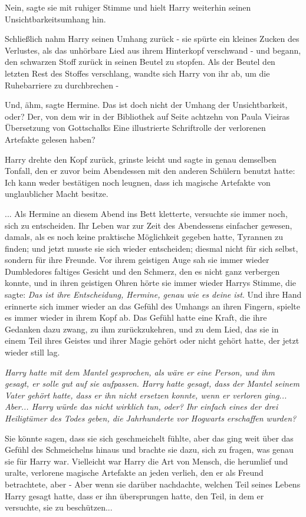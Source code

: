 \glqq{}Nein\grqq{}, sagte sie mit ruhiger Stimme und hielt Harry weiterhin seinen
Unsichtbarkeitsumhang hin.

Schließlich nahm Harry seinen Umhang zurück - sie spürte ein kleines Zucken des
Verlustes, als das unhörbare Lied aus ihrem Hinterkopf verschwand - und begann,
den schwarzen Stoff zurück in seinen Beutel zu stopfen. Als der Beutel den
letzten Rest des Stoffes verschlang, wandte sich Harry von ihr ab, um die
Ruhebarriere zu durchbrechen -

\glqq{}Und, ähm\grqq{}, sagte Hermine. \glqq{}Das ist doch nicht der Umhang der
Unsichtbarkeit, oder? Der, von dem wir in der Bibliothek auf Seite achtzehn von
Paula Vieiras Übersetzung von Gottschalks Eine illustrierte Schriftrolle der
verlorenen Artefakte gelesen haben?\grqq{}

Harry drehte den Kopf zurück, grinste leicht und sagte in genau demselben
Tonfall, den er zuvor beim Abendessen mit den anderen Schülern benutzt hatte:
\glqq{}Ich kann weder bestätigen noch leugnen, dass ich magische Artefakte von
unglaublicher Macht besitze.\grqq{}

... Als Hermine an diesem Abend ins Bett kletterte, versuchte sie immer noch,
sich zu entscheiden. Ihr Leben war zur Zeit des Abendessens einfacher gewesen,
damals, als es noch keine praktische Möglichkeit gegeben hatte, Tyrannen zu
finden; und jetzt musste sie sich wieder entscheiden; diesmal nicht für sich
selbst, sondern für ihre Freunde. Vor ihrem geistigen Auge sah sie immer wieder
Dumbledores faltiges Gesicht und den Schmerz, den es nicht ganz verbergen
konnte, und in ihren geistigen Ohren hörte sie immer wieder Harrys Stimme, die
sagte: \emph{Das ist ihre Entscheidung, Hermine, genau wie es deine ist}. Und
ihre Hand erinnerte sich immer wieder an das Gefühl des Umhangs an ihren
Fingern, spielte es immer wieder in ihrem Kopf ab. Das Gefühl hatte eine Kraft,
die ihre Gedanken dazu zwang, zu ihm zurückzukehren, und zu dem Lied, das sie in
einem Teil ihres Geistes und ihrer Magie gehört oder nicht gehört hatte, der
jetzt wieder still lag.

\emph{Harry hatte mit dem Mantel gesprochen, als wäre er eine Person, und ihm
gesagt, er solle gut auf sie aufpassen. Harry hatte gesagt, dass der Mantel
seinem Vater gehört hatte, dass er ihn nicht ersetzen konnte, wenn er verloren
ging... Aber... Harry würde das nicht wirklich tun, oder? Ihr einfach eines der
drei Heiligtümer des Todes geben, die Jahrhunderte vor Hogwarts erschaffen
wurden?}

Sie könnte sagen, dass sie sich geschmeichelt fühlte, aber das ging weit über
das Gefühl des Schmeichelns hinaus und brachte sie dazu, sich zu fragen, was
genau sie für Harry war. Vielleicht war Harry die Art von Mensch, die herumlief
und uralte, verlorene magische Artefakte an jeden verlieh, den er als Freund
betrachtete, aber - Aber wenn sie darüber nachdachte, welchen Teil seines Lebens
Harry gesagt hatte, dass er ihn übersprungen hatte, den Teil, in dem er
versuchte, sie zu beschützen...

